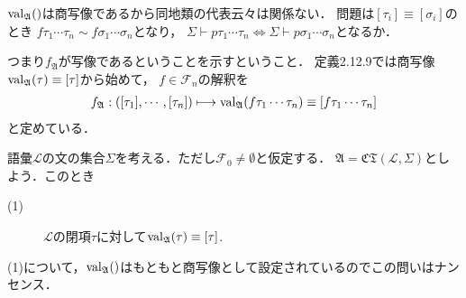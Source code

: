 	\begin{screen}
		\begin{thm}[定義2.12.9の正当性の検証]
			$\operatorname{val}_{\mathfrak{A}}()$は商写像であるから同地類の代表云々は関係ない．
			問題は$[\tau_{i}] \equiv [\sigma_{i}]$のとき
			$f\tau_{1}\cdots\tau_{n} \sim f\sigma_{1}\cdots\sigma_{n}$となり，
			$\Sigma \vdash p\tau_{1}\cdots\tau_{n} \Longleftrightarrow 
			\Sigma \vdash p\sigma_{1}\cdots\sigma_{n}$となるか．
		\end{thm}
	\end{screen}
	
	つまり$f_{\mathfrak{A}}$が写像であるということを示すということ．
	定義2.12.9では商写像$\operatorname{val}_{\mathfrak{A}}(\tau) \equiv [\tau]$から始めて，
	$f \in \mathcal{F}_{n}$の解釈を
	\begin{align}
		f_{\mathfrak{A}}:
		([\tau_{1}],\cdots,[\tau_{n}]) \longmapsto
		\operatorname{val}_{\mathfrak{A}}(f\tau_{1}\cdots\tau_{n})
		\equiv [f\tau_{1}\cdots\tau_{n}]
	\end{align}
	と定めている．
	
	\begin{screen}
		\begin{thm}[補題2.12.10]
			語彙$\mathcal{L}$の文の集合$\Sigma$を考える．ただし$\mathcal{F}_{0} \neq \emptyset$と仮定する．
			$\mathfrak{A} = \mathfrak{CT}(\mathcal{L},\Sigma)$としよう．このとき
			\begin{description}
				\item[(1)] $\mathcal{L}$の閉項$\tau$に対して$\operatorname{val}_{\mathfrak{A}}(\tau) \equiv [\tau]$.
			\end{description}
		\end{thm}
	\end{screen}
	
	\begin{sketch}
		(1)について，$\operatorname{val}_{\mathfrak{A}}()$はもともと商写像として設定されているのでこの問いはナンセンス．
		
	\end{sketch}